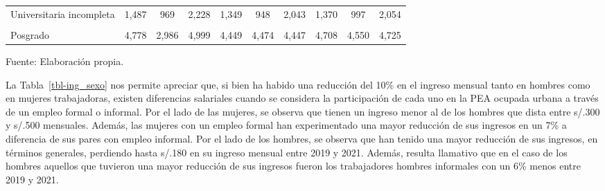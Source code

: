 \documentclass[
  letterpaper,
  12pt,
  oneside,
  spanish,
  doublespacing,
  headsepline,
  parskip]{MastersDoctoralThesis}
\begin{document}
\begin{table}[H]
\begin{tabular}{>{\centering\arraybackslash}p{10em}ccccccccc}
Universitaria incompleta & 1,487 & 969 & 2,228 & 1,349 & 948 & 2,043 & 1,370 & 997 & 2,054\\
\cellcolor{gray!6}{Universitaria completa} & \cellcolor{gray!6}{2,768} & \cellcolor{gray!6}{1,531} & \cellcolor{gray!6}{3,287} & \cellcolor{gray!6}{2,592} & \cellcolor{gray!6}{1,436} & \cellcolor{gray!6}{3,085} & \cellcolor{gray!6}{2,729} & \cellcolor{gray!6}{1,510} & \cellcolor{gray!6}{3,350}\\
Posgrado & 4,778 & 2,986 & 4,999 & 4,449 & 4,474 & 4,447 & 4,708 & 4,550 & 4,725\\
\bottomrule
\end{tabular}
\endgroup{}
\end{table}

\noindent \small Fuente: Elaboración propia. \normalsize

La Tabla~\ref{tbl-ing_sexo} nos permite apreciar que, si bien ha habido
una reducción del 10\% en el ingreso mensual tanto en hombres como en
mujeres trabajadoras, existen diferencias salariales cuando se considera
la participación de cada uno en la PEA ocupada urbana a través de un
empleo formal o informal. Por el lado de las mujeres, se observa que
tienen un ingreso menor al de los hombres que dista entre s/.300 y
s/.500 mensuales. Además, las mujeres con un empleo formal han
experimentado una mayor reducción de sus ingresos en un 7\% a diferencia
de sus pares con empleo informal. Por el lado de los hombres, se observa
que han tenido una mayor reducción de sus ingresos, en términos
generales, perdiendo hasta s/.180 en su ingreso mensual entre 2019 y
2021. Además, resulta llamativo que en el caso de los hombres aquellos
que tuvieron una mayor reducción de sus ingresos fueron los trabajadores
hombres informales con un 6\% menos entre 2019 y 2021.
\end{document}
